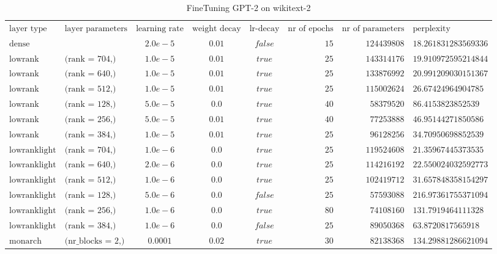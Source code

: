 \begin{table}[h!]
\centering
\tiny
\caption{FineTuning GPT-2 on wikitext-2}
\label{tab:ft_results}
\begin{tabular}{llcccrrl}
$\text{layer type}$ & $\text{layer parameters}$ & $\text{learning rate}$ & $\text{weight decay}$ & $\text{lr-decay}$ & $\text{nr of epochs}$ & $\text{nr of parameters}$ & $\text{perplexity}$\\
$\text{dense}$ & $\text{}$ & $2.0e-5$ & $0.01$ & $false$ & $15$ & $124439808$ & $18.261831283569336$\\
$\text{lowrank}$ & $\text{(rank = 704,)}$ & $1.0e-5$ & $0.01$ & $true$ & $25$ & $143314176$ & $19.910972595214844$\\
$\text{lowrank}$ & $\text{(rank = 640,)}$ & $1.0e-5$ & $0.01$ & $true$ & $25$ & $133876992$ & $20.991209030151367$\\
$\text{lowrank}$ & $\text{(rank = 512,)}$ & $1.0e-5$ & $0.01$ & $true$ & $25$ & $115002624$ & $26.67424964904785$\\
$\text{lowrank}$ & $\text{(rank = 128,)}$ & $5.0e-5$ & $0.0$ & $true$ & $40$ & $58379520$ & $86.4153823852539$\\
$\text{lowrank}$ & $\text{(rank = 256,)}$ & $5.0e-5$ & $0.01$ & $true$ & $40$ & $77253888$ & $46.95144271850586$\\
$\text{lowrank}$ & $\text{(rank = 384,)}$ & $1.0e-5$ & $0.01$ & $true$ & $25$ & $96128256$ & $34.70950698852539$\\
$\text{lowranklight}$ & $\text{(rank = 704,)}$ & $1.0e-6$ & $0.0$ & $true$ & $25$ & $119524608$ & $21.35967445373535$\\
$\text{lowranklight}$ & $\text{(rank = 640,)}$ & $2.0e-6$ & $0.0$ & $true$ & $25$ & $114216192$ & $22.550024032592773$\\
$\text{lowranklight}$ & $\text{(rank = 512,)}$ & $1.0e-6$ & $0.0$ & $true$ & $25$ & $102419712$ & $31.657848358154297$\\
$\text{lowranklight}$ & $\text{(rank = 128,)}$ & $5.0e-6$ & $0.0$ & $false$ & $25$ & $57593088$ & $216.97361755371094$\\
$\text{lowranklight}$ & $\text{(rank = 256,)}$ & $1.0e-6$ & $0.0$ & $true$ & $80$ & $74108160$ & $131.7919464111328$\\
$\text{lowranklight}$ & $\text{(rank = 384,)}$ & $1.0e-6$ & $0.0$ & $false$ & $25$ & $89050368$ & $63.8720817565918$\\
$\text{monarch}$ & $\text{(nr\_blocks = 2,)}$ & $0.0001$ & $0.02$ & $true$ & $30$ & $82138368$ & $134.29881286621094$\\

\end{tabular}
\end{table}
